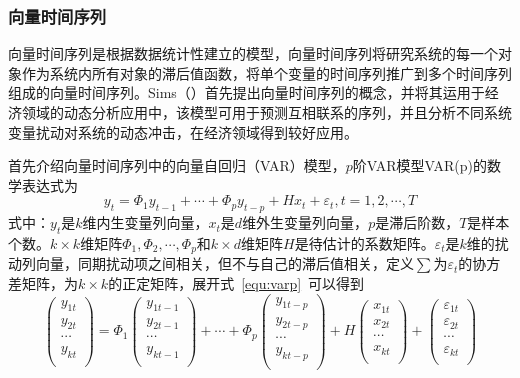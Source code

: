 \subsubsection{向量时间序列}
\label{chap:var}

向量时间序列是根据数据统计性建立的模型，向量时间序列将研究系统的每一个对象作为系统内所有对象的滞后值函数，将单个变量的时间序列推广到多个时间序列组成的向量时间序列。Sims（\citeyear{sims1980macroeconomics}）首先提出向量时间序列的概念，并将其运用于经济领域的动态分析应用中，该模型可用于预测互相联系的序列，并且分析不同系统变量扰动对系统的动态冲击，在经济领域得到较好应用。

首先介绍向量时间序列中的向量自回归（VAR）模型，$p$阶VAR模型VAR(p)的数学表达式为
\begin{equation}
	\label{equ:varp}
	{{y}_{t}}={{\Phi }_{1}}{{y}_{t-1}}+\cdots +{{\Phi }_{p}}{{y}_{t-p}}+H{{x}_{t}}+{{\varepsilon }_{t}},t=1,2,\cdots ,T
\end{equation}
式中：$y_t$是$k$维内生变量列向量，$x_t$是$d$维外生变量列向量，$p$是滞后阶数，$T$是样本个数。$k\times k$维矩阵${\Phi }_1,{\Phi }_2,\cdots ,{\Phi }_p$和$k\times d$维矩阵$H$是待估计的系数矩阵。${\varepsilon }_{t}$是$k$维的扰动列向量，同期扰动项之间相关，但不与自己的滞后值相关，定义$\sum$为${\varepsilon }_{t}$的协方差矩阵，为$k\times k$的正定矩阵，展开式~\ref{equ:varp}~可以得到
\begin{equation}
	\left( \begin{array}{*{35}{l}}
   {{y}_{1t}}  \\
   {{y}_{2t}}  \\
   \cdots   \\
   {{y}_{kt}}  \\
\end{array} \right)={{\Phi }_{1}}\left( \begin{array}{*{35}{l}}
   {{y}_{1t-1}}  \\
   {{y}_{2t-1}}  \\
   \cdots   \\
   {{y}_{kt-1}}  \\
\end{array} \right)+\cdots +{{\Phi }_{p}}\left( \begin{array}{*{35}{l}}
   {{y}_{1t-p}}  \\
   {{y}_{2t-p}}  \\
   \cdots   \\
   {{y}_{kt-p}}  \\
\end{array} \right)+H\left( \begin{array}{*{35}{l}}
   {{x}_{1t}}  \\
   {{x}_{2t}}  \\
   \cdots   \\
   {{x}_{kt}}  \\
\end{array} \right)+\left( \begin{array}{*{35}{l}}
   {{\varepsilon }_{1t}}  \\
   {{\varepsilon }_{2t}}  \\
   \cdots   \\
   {{\varepsilon }_{kt}}  \\
\end{array} \right)
\end{equation}
